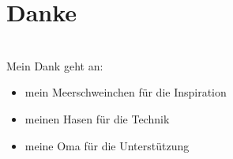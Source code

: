 \chapter{Danke}
\label{chp:danke}

\\

Mein Dank geht an:\\

\begin{itemize}
\item mein Meerschweinchen f\"ur die Inspiration
\item meinen Hasen f\"ur die Technik
\item meine Oma f\"ur die Unterst\"utzung
\end{itemize}
